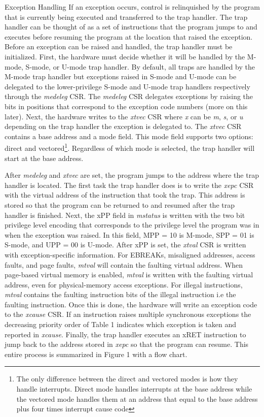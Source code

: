 \documentclass[12pt]{article}
\begin{document}
\begin{section}{Exception Handling}
If an exception occurs, control is relinquished by the program that is currently being executed and transferred to the trap handler. The trap handler can be thought of as a set of instructions that the program jumps to and executes before resuming the program at the location that raised the exception. Before an exception can be raised and handled, the trap handler must be initialized. First, the hardware must decide whether it will be handled by the M-mode, S-mode, or U-mode trap handler. By default, all traps are handled by the M-mode trap handler but exceptions raised in S-mode and U-mode can be delegated to the lower-privilege S-mode and U-mode trap handlers respectively through the \emph{medeleg} CSR. The \emph{medeleg} CSR delegates exceptions by raising the bits in positions that correspond to the exception code numbers (more on this later). Next, the hardware writes to the \emph{xtvec} CSR where \emph{x} can be \emph{m}, \emph{s}, or \emph{u} depending on the trap handler the exception is delegated to. The \emph{xtvec} CSR contains a base address and a mode field. This mode field supports two options: direct and vectored\footnote[1]{The only difference between the direct and vectored modes is how they handle interrupts. Direct mode handles interrupts at the base address while the vectored mode handles them at an address that equal to the base address plus four times interrupt cause code}. Regardless of which mode is selected, the trap handler will start at the base address. 

After \emph{medeleg} and \emph{xtvec} are set, the program jumps to the address where the trap handler is located. The first task the trap handler does is to write the \emph{xepc} CSR with the virtual address of the instruction that took the trap. This address is stored so that the program can be returned to and resumed after the trap handler is finished. Next, the xPP field in \emph{mstatus} is written with the two bit privilege level encoding that corresponds to the privilege level the program was in when the exception was raised. In this field, MPP = 10 is M-mode, SPP = 01 is S-mode, and UPP = 00 is U-mode. After xPP is set, the \emph{xtval} CSR is written with exception-specific information. For EBREAKs, misaligned addresses, access faults, and page faults, \emph{mtval} will contain the faulting virtual address. When page-based virtual memory is enabled, \emph{mtval} is written with the faulting virtual address, even for physical-memory access exceptions. For illegal instructions, \emph{mtval} contains the faulting instruction bits of the illegal instruction i.e the faulting instruction. Once this is done, the hardware will write an exception code to the \emph{xcause} CSR. If an instruction raises multiple synchronous exceptions the decreasing priority order of Table 1 indicates which exception is taken and reported in \emph{xcause}. Finally, the trap handler executes an xRET instruction to jump back to the address stored in \emph{xepc} so that the program can resume. This entire process is summarized in Figure 1 with a flow chart.   
\end{section}
\end{document}
